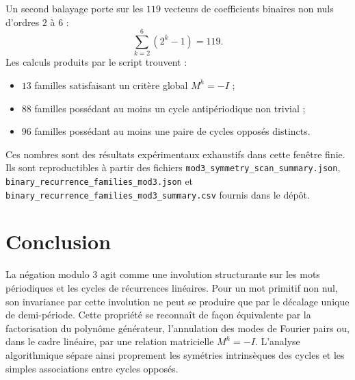 \documentclass[11pt,a4paper]{article}
\begin{document}
Un second balayage porte sur les \(119\) vecteurs de coefficients binaires
non nuls d'ordres \(2\) à \(6\) :
\[
\sum_{k=2}^{6}(2^k-1)=119.
\]
Les calculs produits par le script trouvent :
\begin{itemize}
\item \(13\) familles satisfaisant un critère global \(M^h=-I\) ;
\item \(88\) familles possédant au moins un cycle antipériodique non trivial ;
\item \(96\) familles possédant au moins une paire de cycles opposés distincts.
\end{itemize}

Ces nombres sont des résultats expérimentaux exhaustifs dans cette fenêtre
finie. Ils sont reproductibles à partir des fichiers
\texttt{mod3\_symmetry\_scan\_summary.json},
\texttt{binary\_recurrence\_families\_mod3.json} et
\texttt{binary\_recurrence\_families\_mod3\_summary.csv} fournis dans le dépôt.

\section*{Conclusion}

La négation modulo 3 agit comme une involution structurante sur les mots
périodiques et les cycles de récurrences linéaires. Pour un mot primitif non
nul, son invariance par cette involution ne peut se produire que par le
décalage unique de demi-période. Cette propriété se reconnaît de façon
équivalente par la factorisation du polynôme générateur, l'annulation des
modes de Fourier pairs ou, dans le cadre linéaire, par une relation matricielle
\(M^h=-I\). L'analyse algorithmique sépare ainsi proprement les symétries
intrinsèques des cycles et les simples associations entre cycles opposés.
\end{document}
